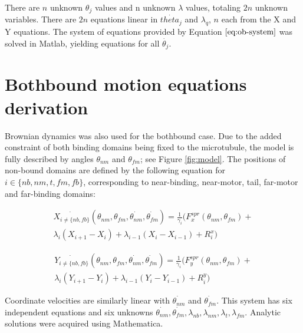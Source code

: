\documentclass[9pt,twocolumn,twoside]{pnas-new}
\begin{document}
{  There are $n$ unknown $\theta_j$ values and n unknown $\lambda$ values, totaling $2n$ unknown variables. There are $2n$ equations linear in $\dot{theta_j}$ and $\lambda_q$, $n$ each from the X and Y equations. The system of equations provided by Equation $\ref{eq:ob-system}$ was solved in Matlab, yielding equations for all $\dot{\theta_j}$.

  \section*{Bothbound motion equations derivation}
  Brownian dynamics was also used for the bothbound case. Due to the added constraint of both binding domains being fixed to the microtubule, the model is fully described by angles $\theta_{nm}$ and $\theta_{fm}$; see Figure \ref{fig:model}. The positions of non-bound domains are defined by the following equation for $i \in \{nb, nm, t, fm, fb\}$, corresponding to near-binding, near-motor, tail, far-motor and far-binding domains:

  \begin{multline}
    \dot{X_{i\neq\{nb, fb\}}}\left(\theta_{nm},\theta_{fm}, \dot{\theta_{nm}}, \dot{\theta_{fm}}\right) = \frac{1}{\gamma_i}\big(F^{spr}_x(\theta_{nm}, \theta_{fm}) + \\
    \lambda_i\left(X_{i+1}-X_i\right) + \lambda_{i-1}\left(X_i-X_{i-1}\right) + R^x_i\big)
    \label{eq:bb-system}
  \end{multline}

  \begin{multline}
    \dot{Y_{i\neq\{nb, fb\}}}\left(\theta_{nm},\theta_{fm}, \dot{\theta_{nm}}, \dot{\theta_{fm}}\right) = \frac{1}{\gamma_i}\big(F^{spr}_y(\theta_{nm}, \theta_{fm}) + \\
    \lambda_i\left(Y_{i+1}-Y_i\right) + \lambda_{i-1}\left(Y_i-Y_{i-1}\right) + R^y_i\big)
    \label{eq:bb-system}
  \end{multline}

  Coordinate velocities are similarly linear with $\dot{\theta_{nm}}$ and $\dot{\theta_{fm}}$. This system has six independent equations and six unknowns $\dot{\theta_{nm}}, \dot{\theta_{fm}}, \lambda_{nb}, \lambda_{nm}, \lambda_{t}, \lambda_{fm}$. Analytic solutions were acquired using Mathematica.

}
\end{document}

